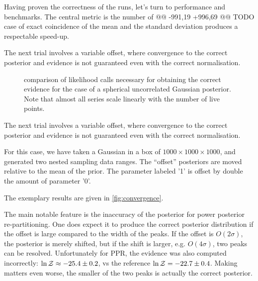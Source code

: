 \documentclass[usenatbib]{mnras}
\begin{document}
     Having proven the correctness of the runs, let's turn to
   performance and benchmarks. The central metric is the number of
@@ -991,19 +996,69 @@ TODO
   case of exact coincidence of the mean and the standard deviation
   produces a respectable speed-up. 

The next trial involves a variable offset, where convergence to the
correct posterior and evidence is not guaranteed even with the
correct normalisation. 


\begin{figure}
  
\caption{\label{org663ae95}
comparison of likelihood calls necessary for obtaining the correct evidence for the case of a spherical uncorrelated Gaussian posterior. Note that almost all series scale linearly with the number of live points.}
\end{figure}




The next trial involves a variable offset, where convergence to the
correct posterior and evidence is not guaranteed even with the
correct normalisation.    

For this case, we have taken a Gaussian in a box of
\(1000\times1000\times1000\), and generated two nested sampling data
ranges. The ``offset'' posteriors are moved relative to the mean of
the prior. The parameter labeled '1' is offset by double the amount
of parameter '0'. 

The exemplary results are given in \autoref{fig:convergence}.

The main notable feature is the inaccuracy of the posterior for
power posterior re-partitioning. One does expect it to produce the
correct posterior distribution if the offset is large compared to
the width of the peaks. If the offset is \(O(2\sigma)\), the
posterior is merely shifted, but if the shift is larger,
e.g. \(O(4\sigma)\), two peaks can be resolved. Unfortunately for
PPR, the evidence was also computed incorrectly: \(\ln {\cal
  Z}\approx -25.4 \pm 0.2\), vs the reference \(\ln {\cal Z} = -22.7 \pm
  0.4\).  Making matters even worse, the smaller of the two peaks is
actually the correct posterior.
\end{document}
